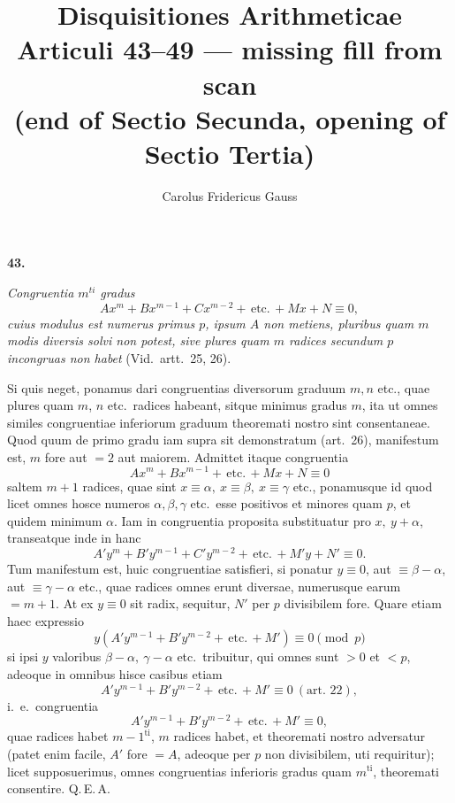 \documentclass[12pt,a4paper]{article}
\title{Disquisitiones Arithmeticae\\[0.4em]
\large Articuli 43--49 --- missing fill from scan\\
(end of Sectio Secunda, opening of Sectio Tertia)}
\author{Carolus Fridericus Gauss}
\date{}
\begin{document}
\maketitle
{}

\noindent\textbf{43.}

\medskip

\textit{Congruentia $m^{ti}$ gradus}
\[
  Ax^{m} + Bx^{m-1} + Cx^{m-2} + \,\text{etc.}\, + Mx + N \equiv 0,
\]
\textit{cuius modulus est numerus primus $p$, ipsum $A$ non metiens, pluribus
quam $m$ modis diversis solvi non potest, sive plures quam $m$ radices secundum
$p$ incongruas non habet} (Vid.\ artt.\ 25, 26).

\medskip

Si quis neget, ponamus dari congruentias diversorum graduum $m, n$ etc.,
quae plures quam $m$, $n$ etc.\ radices habeant, sitque minimus gradus $m$,
ita ut omnes similes congruentiae inferiorum graduum theoremati nostro sint
consentaneae. Quod quum de primo gradu iam supra sit demonstratum (art.~26),
manifestum est, $m$ fore aut $= 2$ aut maiorem. Admittet itaque congruentia
\[
  Ax^{m} + Bx^{m-1} + \,\text{etc.}\, + Mx + N \equiv 0
\]
saltem $m+1$ radices, quae sint $x \equiv \alpha,\ x \equiv \beta,\ x \equiv \gamma$
etc., ponamusque id quod licet omnes hosce numeros $\alpha, \beta, \gamma$ etc.\
esse positivos et minores quam $p$, et quidem minimum $\alpha$. Iam in
congruentia proposita substituatur pro $x,\ y + \alpha$, transeatque inde in hanc
\[
  A' y^{m} + B' y^{m-1} + C' y^{m-2} + \,\text{etc.}\, + M' y + N' \equiv 0.
\]
Tum manifestum est, huic congruentiae satisfieri, si ponatur $y \equiv 0$, aut
$\equiv \beta - \alpha$, aut $\equiv \gamma - \alpha$ etc., quae radices omnes
erunt diversae, numerusque earum $= m+1$. At ex $y \equiv 0$ sit radix, sequitur,
$N'$ per $p$ divisibilem fore. Quare etiam haec expressio
\[
  y(A' y^{m-1} + B' y^{m-2} + \,\text{etc.}\, + M') \equiv 0 \pmod{p}
\]
si ipsi $y$ valoribus $\beta - \alpha,\ \gamma - \alpha$ etc.\ tribuitur, qui omnes
sunt $> 0$ et $< p$, adeoque in omnibus hisce casibus etiam
\[
  A' y^{m-1} + B' y^{m-2} + \,\text{etc.}\, + M' \equiv 0\ (\text{art.\ 22}),
\]
i.~e.\ congruentia
\[
  A' y^{m-1} + B' y^{m-2} + \,\text{etc.}\, + M' \equiv 0,
\]
quae radices habet $m-1^{\text{ti}}$, $m$ radices habet, et theoremati nostro adversatur
(patet enim facile, $A'$ fore $= A$, adeoque per $p$ non divisibilem, uti requiritur);
licet supposuerimus, omnes congruentias inferioris gradus quam $m^{\text{ti}}$,
theoremati consentire. Q.\,E.\,A.
\end{document}
